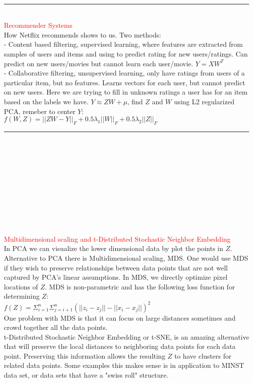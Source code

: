 \documentclass[8pt]{extarticle}
\begin{document}
\begin{multicols*}{2}
\\
\rule{\linewidth}{0.5mm} 
\\
\textcolor{red}{Recommender Systems}
\\
How Netflix recommends shows to us. Two methods:
\\
- Content based filtering, supervised learning, where features are extracted from samples of users and items and using to predict rating for new users/ratings. Can predict on new users/movies but cannot learn each user/movie. $Y = XW^T$
\\
- Collaborative filtering, unsupervised learning, only have ratings from users of a particular item, but no features. Learns vectors for each user, but cannot predict on new users. Here we are trying to fill in unknown ratings a user has for an item based on the labels we have. $Y \approx ZW+\mu$, find $Z$ and $W$ using L2 regularized PCA, remeber to center $Y$:
\\
$f(W,Z) = ||ZW - Y||_F + 0.5\lambda_1||W||_F+0.5\lambda_2||Z||_F$
\\
\rule{\linewidth}{0.5mm} 
\\\\\\\\\\\\\\\\\\\\
\textcolor{red}{Multidimensional scaling and t-Distributed Stochastic Neighbor Embedding}
\\
In PCA we can visualize the lower dimensional data by plot the points in $Z$. Alternative to PCA there is Multidimensional scaling, MDS. One would use MDS if they wish to preserve relationships between data points that are not well captured by PCA's linear assumptions. In MDS, we directly optimize pixel locations of $Z$. MDS is non-parametric and has the following loss function for determining $Z$:
\\
$f(Z) = \Sigma_{i=1}^n \Sigma_{j=i+1}^n (||z_i-z_j||-||x_i-x_j||)^2$
\\
One problem with MDS is that it can focus on large distances sometimes and crowd together all the data points.
\\
t-Distributed Stochastic Neighbor Embedding or t-SNE, is an amazing alternative that will preserve the local distances to neighboring data points for each data point. Preserving this information allows the resulting $Z$ to have clusters for related data points. Some examples this makes sense is in application to MINST data set, or data sets that have a "swiss roll" structure.

\end{multicols*}
\end{document}
